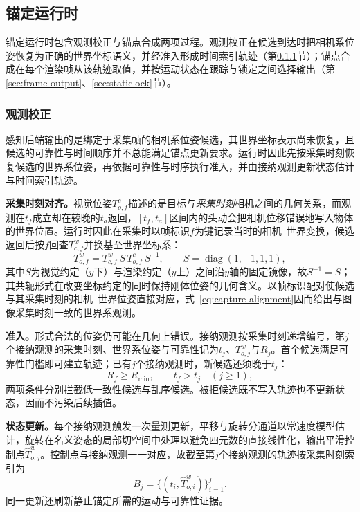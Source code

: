\documentclass[review]{vgtc}
\begin{document}
\subsection{锚定运行时}\label{sec:anchoring}

锚定运行时包含观测校正与锚点合成两项过程。观测校正在候选到达时把相机系位姿恢复为正确的世界坐标语义，并经准入形成时间索引轨迹（第\ref{sec:obs-update}节）；锚点合成在每个渲染帧从该轨迹取值，并按运动状态在跟踪与锁定之间选择输出（第\ref{sec:frame-output}、\ref{sec:staticlock}节）。

\subsubsection{观测校正}\label{sec:obs-update}

感知后端输出的是绑定于采集帧的相机系位姿候选，其世界坐标表示尚未恢复，且候选的可靠性与时间顺序并不总能满足锚点更新要求。运行时因此先按采集时刻恢复候选的世界系位姿，再依据可靠性与时序执行准入，并由接纳观测更新状态估计与时间索引轨迹。

\textbf{采集时刻对齐。}视觉位姿$T_{o,f}^{c}$描述的是目标与\emph{采集时刻}相机之间的几何关系，而观测在$t_f$成立却在较晚的$t_a$返回，$[t_f, t_a]$区间内的头动会把相机位移错误地写入物体的世界位置。运行时因此在采集时以帧标识$f$为键记录当时的相机--世界变换，候选返回后按$f$回查$T_{c,f}^{w}$并换基至世界坐标系：
\begin{equation}
T_{o,f}^{w} = T_{c,f}^{w}\, S\, T_{o,f}^{c}\, S^{-1}, \qquad S = \operatorname{diag}(1,-1,1,1),
\label{eq:capture-alignment}
\end{equation}
其中$S$为视觉约定（$y$下）与渲染约定（$y$上）之间沿$y$轴的固定镜像，故$S^{-1}=S$；其共轭形式在改变坐标约定的同时保持刚体位姿的几何含义。以帧标识配对使候选与其采集时刻的相机--世界位姿直接对应，式~\eqref{eq:capture-alignment}因而给出与图像采集时刻一致的世界系观测。

\textbf{准入。}形式合法的位姿仍可能在几何上错误。接纳观测按采集时刻递增编号，第$j$个接纳观测的采集时刻、世界系位姿与可靠性记为$t_j$、$T_{o,j}^{w}$与$R_j$。首个候选满足可靠性门槛即可建立轨迹；已有$j$个接纳观测时，新候选还须晚于$t_j$：
\begin{equation}
R_f \geq R_{\min}, \qquad t_f > t_j \quad (j \geq 1),
\label{eq:admission}
\end{equation}
两项条件分别拦截低一致性候选与乱序候选。被拒候选既不写入轨迹也不更新状态，因而不污染后续插值。

\textbf{状态更新。}每个接纳观测触发一次量测更新，平移与旋转分通道以常速度模型估计，旋转在名义姿态的局部切空间中处理以避免四元数的直接线性化，输出平滑控制点$\widehat{T}_{o,j}^{w}$。控制点与接纳观测一一对应，故截至第$j$个接纳观测的轨迹按采集时刻索引为
\begin{equation}
B_j = \{(t_i, \widehat{T}_{o,i}^{w})\}_{i=1}^{j}.
\label{eq:trajectory}
\end{equation}
同一更新还刷新静止锚定所需的运动与可靠性证据。
\end{document}
